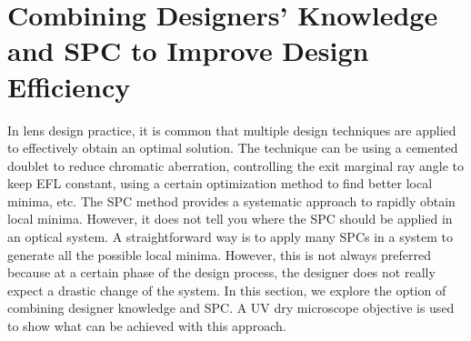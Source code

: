 \section{Combining Designers' Knowledge and SPC to Improve Design Efficiency}
In lens design practice, it is common that multiple design techniques are applied to effectively obtain an optimal solution. The technique can be using a cemented doublet to reduce chromatic aberration, controlling the exit marginal ray angle to keep EFL constant, using a certain optimization method to find better local minima, etc. The SPC method provides a systematic approach to rapidly obtain local minima. However, it does not tell you where the SPC should be applied in an optical system. A straightforward way is to apply many SPCs in a system to generate all the possible local minima. However, this is not always preferred because at a certain phase of the design process, the designer does not really expect a drastic change of the system. In this section, we explore the option of combining designer knowledge and SPC. A UV dry microscope objective is used to show what can be achieved with this approach. 

